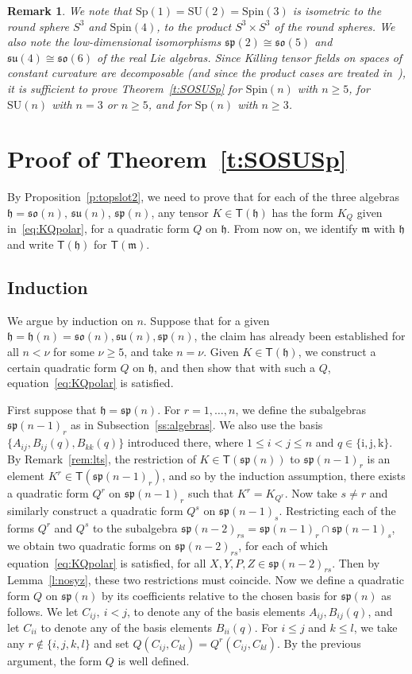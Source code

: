 \documentclass[10pt,a4paper]{amsart}
\newcommand \Sp{\mathrm{Sp}}
\newcommand \SU{\mathrm{SU}}
\newcommand \Spin{\mathrm{Spin}}
\newcommand \sT{\mathsf{T}}
\newcommand\h{\mathfrak h}
\newcommand\m{\mathfrak m}
\newcommand \so{\mathfrak{so}}
\newcommand \spg{\mathfrak{sp}}
\newcommand \su{\mathfrak{su}}
\newcommand \ir{\mathrm{i}}
\newcommand \jr{\mathrm{j}}
\newcommand \kr{\mathrm{k}}
\newcommand \<{\langle}
\renewcommand \>{\rangle}
\newtheorem{remark}{Remark}
\begin{document}
	\begin{remark} \label{rem:low}
		We note that $\Sp(1)=\SU(2)=\Spin(3)$ is isometric to the round sphere $S^3$ and $\Spin(4)$, to the product $S^3 \times S^3$ of the round spheres. We also note the low-dimensional isomorphisms $\spg(2)\cong\so(5)$ and $\su(4)\cong\so(6)$ of the real Lie algebras. Since Killing tensor fields on spaces of constant curvature are decomposable (and since the product cases are treated in~\cite[Theorem~1]{MN2}), it is sufficient to prove Theorem~\ref{t:SOSUSp} for $\Spin(n)$ with $n\geq 5$, for $\SU(n)$ with $n=3$ or $n\geq 5$, and for $\Sp(n)$ with $n\geq 3$.
	\end{remark}
	
	
	\section{Proof of Theorem~\ref{t:SOSUSp}}
	\label{s:proof}
	
	By Proposition~\ref{p:topslot2}, we need to prove that for each of the three algebras $\h = \so(n), \, \su(n)$, $\spg(n)$, any tensor $K \in \sT(\h)$ has the form $K_Q$ given in~\eqref{eq:KQpolar}, for a quadratic form $Q$ on $\h$. From now on, we identify $\m$ with $\h$ and write $\sT(\h)$ for $\sT(\m)$.
	
	\subsection{Induction}
	\label{ss:induction}
	
	We argue by induction on $n$. Suppose that for a given $\h=\h(n) = \so(n), \su(n), \spg(n)$, the claim has already been established for all $n < \nu$ for some $\nu \ge 5$, and take $n = \nu$. Given $K \in \sT(\h)$, we construct a certain quadratic form $Q$ on $\h$, and then show that with such a $Q$, equation~\eqref{eq:KQpolar} is satisfied.
	
	First suppose that $\h = \spg(n)$. For $r=1, \dots, n$, we define the subalgebras $\spg(n-1)_r$ as in Subsection~\ref{ss:algebras}. We also use the basis $\{A_{ij}, B_{ij}(q), B_{kk}(q)\}$ introduced there, where $1 \le i < j\le n$ and $q \in \{\ir,\jr,\kr\}$. By Remark~\ref{rem:lts}, the restriction of $K \in \sT(\spg(n))$ to $\spg(n-1)_r$ is an element $K^r \in \sT(\spg(n-1)_r)$, and so by the induction assumption, there exists a quadratic form $Q^r$ on $\spg(n-1)_r$ such that $K^r = K_{Q^r}$. Now take $s \ne r$ and similarly construct a quadratic form $Q^s$ on $\spg(n-1)_s$. Restricting each of the forms $Q^r$ and $Q^s$ to the subalgebra $\spg(n-2)_{rs} = \spg(n-1)_r \cap \spg(n-1)_s$, we obtain two quadratic forms on $\spg(n-2)_{rs}$, for each of which equation~\eqref{eq:KQpolar} is satisfied, for all $X, Y, P, Z \in \spg(n-2)_{rs}$. Then by Lemma~\ref{l:nosyz}, these two restrictions must coincide. Now we define a quadratic form $Q$ on $\spg(n)$ by its coefficients relative to the chosen basis for $\spg(n)$ as follows. We let $C_{ij}, \ i < j$, to denote any of the basis elements $A_{ij}, B_{ij}(q)$, and let $C_{ii}$ to denote any of the basis elements $B_{ii}(q)$. For $i \le j$ and $k \le l$, we take any $r \notin \{i,j,k,l\}$ and set $Q(C_{ij}, C_{kl}) = Q^r(C_{ij}, C_{kl})$. By the previous argument, the form $Q$ is well defined.
	
\end{document}

